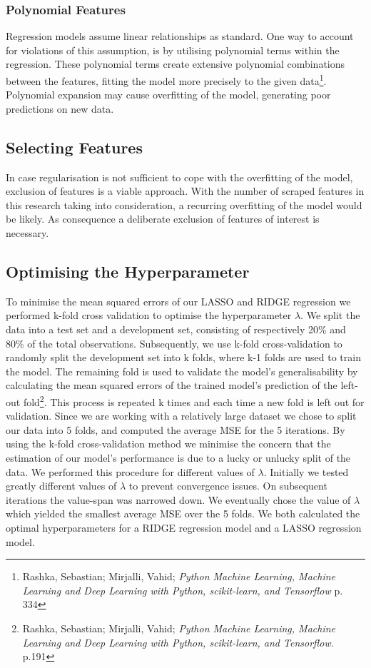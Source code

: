 \documentclass[12pt,a4paper]{article}
\begin{document}
\subsubsection{Polynomial Features}
Regression models assume linear relationships as standard. One way to account for violations of this assumption, is by utilising polynomial terms within the regression. These polynomial terms create extensive polynomial combinations between the features, fitting the model more precisely to the given data\footnote{Rashka, Sebastian; Mirjalli, Vahid; \textit{Python Machine Learning, Machine Learning and Deep Learning with Python, scikit-learn, and Tensorflow} p. 334}. Polynomial expansion may cause overfitting of the model, generating poor predictions on new data.

\subsection{Selecting Features}
In case regularisation is not sufficient to cope with the overfitting of the model, exclusion of features is a viable approach. With the number of scraped features in this research taking into consideration, a recurring overfitting of the model would be likely. As consequence a deliberate exclusion of features of interest is necessary.    

\subsection{Optimising the Hyperparameter}
To minimise the mean squared errors of our LASSO and RIDGE regression we performed k-fold cross validation to optimise the hyperparameter $\lambda$. 
We split the data into a test set and a development set, consisting of respectively 20\% and 80\% of the total observations. Subsequently, we use k-fold cross-validation to randomly split the development set into k folds, where k-1 folds are used to train the model. The remaining fold is used to validate the model’s generalisability by calculating the mean squared errors of the trained model’s prediction of the left-out fold\footnote{Rashka, Sebastian; Mirjalli, Vahid; \textit{Python Machine Learning, Machine Learning and Deep Learning with Python, scikit-learn, and Tensorflow}. p.191}. This process is repeated k times and each time a new fold is left out for validation. Since we are working with a relatively large dataset we chose to split our data into 5 folds, and computed the average MSE for the 5 iterations. By using the k-fold cross-validation method we minimise the concern that the estimation of our model’s performance is due to a lucky or unlucky split of the data. \newline
We performed this procedure for different values of $\lambda$. Initially we tested greatly different values of $\lambda$ to prevent convergence issues. On subsequent iterations the value-span was narrowed down. We eventually chose the value of $\lambda$ which yielded the smallest average MSE over the 5 folds. 
We both calculated the optimal hyperparameters for a RIDGE regression model and a LASSO regression model.
\end{document}
